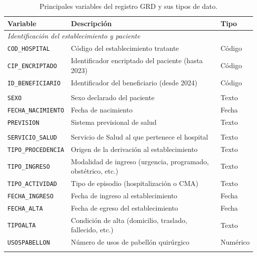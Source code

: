 \begin{table}[htbp]
\centering
\caption{Principales variables del registro GRD y sus tipos de dato.}
\label{tab:variables-grd}
\begin{tabular}{p{4.2cm} p{7.0cm} p{1.8cm}}
\toprule
\textbf{Variable} & \textbf{Descripción} & \textbf{Tipo} \\
\midrule
\multicolumn{3}{l}{\textit{Identificación del establecimiento y paciente}} \\
\addlinespace
\texttt{COD\_HOSPITAL}        & Código del establecimiento tratante           & Código \\
\texttt{CIP\_ENCRIPTADO}      & Identificador encriptado del paciente (hasta 2023) & Código \\
\texttt{ID\_BENEFICIARIO}     & Identificador del beneficiario (desde 2024)   & Código \\
\addlinespace
\multicolumn{3}{l}{\textit{Datos del paciente}} \\
\addlinespace
\texttt{SEXO}                 & Sexo declarado del paciente                   & Texto \\
\texttt{FECHA\_NACIMIENTO}    & Fecha de nacimiento                           & Fecha \\
\texttt{PREVISION}            & Sistema previsional de salud                  & Texto \\
\addlinespace
\multicolumn{3}{l}{\textit{Información hospitalaria}} \\
\addlinespace
\texttt{SERVICIO\_SALUD}      & Servicio de Salud al que pertenece el hospital & Texto \\
\texttt{TIPO\_PROCEDENCIA}    & Origen de la derivación al establecimiento    & Texto \\
\texttt{TIPO\_INGRESO}        & Modalidad de ingreso (urgencia, programado, obstétrico, etc.) & Texto \\
\texttt{TIPO\_ACTIVIDAD}      & Tipo de episodio (hospitalización o CMA)      & Texto \\
\texttt{FECHA\_INGRESO}       & Fecha de ingreso al establecimiento           & Fecha \\
\texttt{FECHA\_ALTA}          & Fecha de egreso del establecimiento           & Fecha \\
\texttt{TIPOALTA}             & Condición de alta (domicilio, traslado, fallecido, etc.) & Texto \\
\texttt{USOSPABELLON}         & Número de usos de pabellón quirúrgico         & Numérico \\
\addlinespace

\end{tabular}
\end{table}
